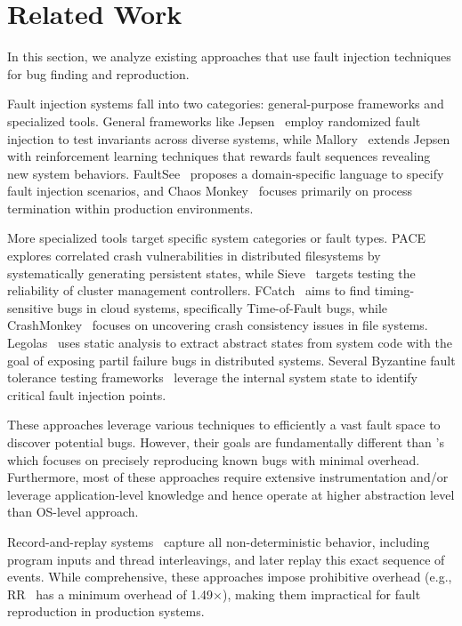 \section{Related Work}

In this section, we analyze existing approaches that use fault injection techniques for bug finding and reproduction.

Fault injection systems fall into two categories: general-purpose frameworks and specialized tools.
General frameworks like Jepsen~\cite{jepsen}  employ randomized fault injection to test invariants across diverse systems, while Mallory~\cite{mallory} extends Jepsen with  reinforcement learning techniques that rewards fault sequences revealing new system behaviors.
FaultSee~\cite{9237004} proposes a domain-specific language to specify fault injection scenarios, and Chaos Monkey~\cite{chaosmonkey} focuses primarily on process termination within production environments.

More specialized tools target specific system categories or fault types.
PACE~\cite{AlagappanEtAl16-OSDI} explores correlated crash vulnerabilities in distributed filesystems by systematically generating persistent states, while Sieve~\cite{sieve}  targets testing the reliability of cluster management controllers.
FCatch~\cite{fcatch} aims to find timing-sensitive bugs in cloud systems, specifically Time-of-Fault bugs, while CrashMonkey~\cite{crashmonkey18mohan} focuses on uncovering   crash consistency issues in file systems.
Legolas~\cite{legolas} uses static analysis to extract abstract states from system code with the goal of exposing partil failure bugs in distributed systems.
Several Byzantine fault tolerance testing frameworks~\cite{toolbft, bftcc, twins, byzzfuzz, tyr} leverage the internal system state to identify critical fault injection points.

These approaches leverage various techniques to efficiently a vast fault space to discover potential bugs.
However, their goals are fundamentally different than \sys's which focuses on precisely reproducing known bugs with minimal overhead.
Furthermore, most of these approaches require extensive instrumentation and/or leverage application-level knowledge and hence operate at higher abstraction level than \sys OS-level approach.


Record-and-replay systems~\cite{r2,ireplayer,doubleplay,mozilarr} capture all non-deterministic behavior, including program inputs and thread interleavings, and later replay this exact sequence of events.
While comprehensive, these approaches impose prohibitive overhead (e.g., RR~\cite{mozilarr} has a minimum overhead of 1.49×), making them impractical for fault reproduction in production systems.


